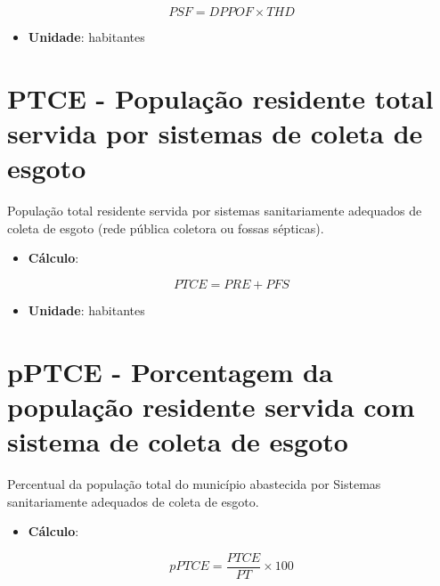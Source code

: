 \documentclass[]{book}
\providecommand{\tightlist}{%
  \setlength{\itemsep}{0pt}\setlength{\parskip}{0pt}}
\begin{document}
\[
PSF = DPPOF \times THD
\]

\begin{itemize}
\tightlist
\item
  \textbf{Unidade}: habitantes
\end{itemize}

\hypertarget{ptce---populauxe7uxe3o-residente-total-servida-por-sistemas-de-coleta-de-esgoto}{%
\section*{PTCE - População residente total servida por sistemas de coleta de esgoto}\label{ptce---populauxe7uxe3o-residente-total-servida-por-sistemas-de-coleta-de-esgoto}}

População total residente servida por sistemas sanitariamente adequados de coleta de esgoto (rede pública coletora ou fossas sépticas).

\begin{itemize}
\tightlist
\item
  \textbf{Cálculo}:
\end{itemize}

\[
PTCE = PRE + PFS
\]

\begin{itemize}
\tightlist
\item
  \textbf{Unidade}: habitantes
\end{itemize}

\hypertarget{pptce---porcentagem-da-populauxe7uxe3o-residente-servida-com-sistema-de-coleta-de-esgoto}{%
\section*{pPTCE - Porcentagem da população residente servida com sistema de coleta de esgoto}\label{pptce---porcentagem-da-populauxe7uxe3o-residente-servida-com-sistema-de-coleta-de-esgoto}}

Percentual da população total do município abastecida por Sistemas sanitariamente adequados de coleta de esgoto.

\begin{itemize}
\tightlist
\item
  \textbf{Cálculo}:
\end{itemize}

\[
pPTCE =\frac{PTCE}{PT} \times 100
\]
\end{document}

